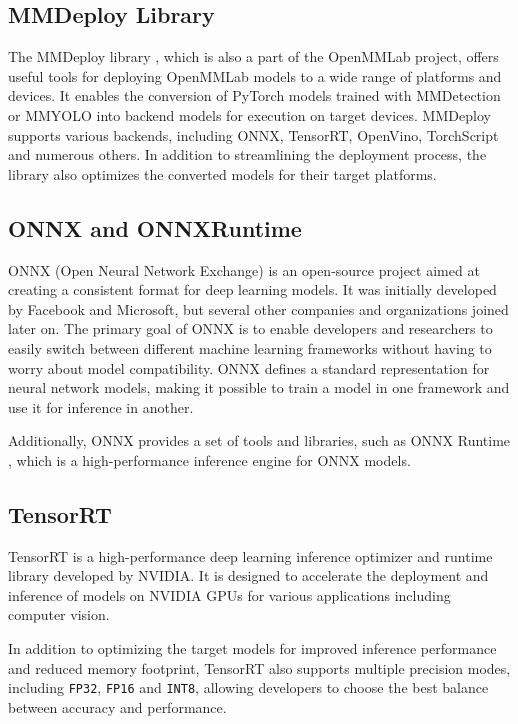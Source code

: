 \subsection{MMDeploy Library}

The MMDeploy library \cite{MMDeploy}, which is also a part of the OpenMMLab project,
offers useful tools for deploying OpenMMLab models to a wide range of platforms
and devices. It enables the conversion of PyTorch models trained with
MMDetection or MMYOLO into backend models for execution on target devices.
MMDeploy supports various backends, including ONNX, TensorRT, OpenVino,
TorchScript and numerous others. In addition to streamlining the deployment
process, the library also optimizes the converted models for their target
platforms.


\subsection{ONNX and ONNXRuntime}

ONNX (Open Neural Network Exchange) \cite{ONNX} is an open-source project aimed
at creating a consistent format for deep learning models. It was initially
developed by Facebook and Microsoft, but several other companies and
organizations joined later on. The primary goal of ONNX is to enable developers
and researchers to easily switch between different machine learning frameworks
without having to worry about model compatibility. ONNX defines a standard
representation for neural network models, making it possible to train a model in
one framework and use it for inference in another.

Additionally, ONNX provides a set of tools and libraries, such as ONNX Runtime
\cite{ONNXRuntime}, which is a high-performance inference engine for ONNX
models.


\subsection{TensorRT}

TensorRT  is a high-performance deep learning inference optimizer and runtime
library developed by NVIDIA. It is designed to accelerate the deployment and
inference of models on NVIDIA GPUs for various applications including computer
vision.

In addition to optimizing the target models for improved inference
performance and reduced memory footprint, TensorRT also supports multiple
precision modes, including \texttt{FP32}, \texttt{FP16} and \texttt{INT8},
allowing developers to choose the best balance between accuracy and performance.



